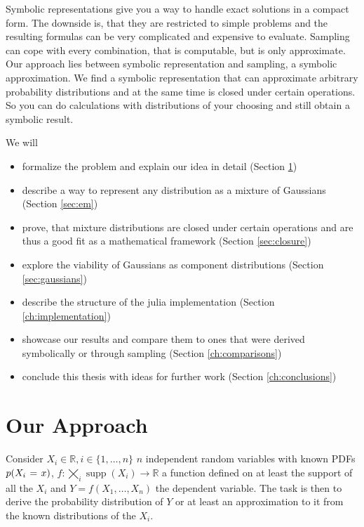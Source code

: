 \documentclass[11pt,a4paper]{book}
\DeclareMathOperator{\supp}{supp}
\begin{document}
Symbolic representations give you a way to handle exact solutions in a compact
form. The downside is, that they are restricted to simple problems and the
resulting formulas can be very complicated and expensive to evaluate. Sampling
can cope with every combination, that is computable, but is only
approximate. Our approach lies between symbolic representation and sampling, a
symbolic approximation. We find a symbolic representation that can approximate
arbitrary probability distributions and at the same time is closed under certain
operations. So you can do calculations with distributions of your choosing and
still obtain a symbolic result.

We will
\begin{itemize}
\item formalize the problem and explain our idea in detail (Section
  \ref{ch:idea})
\item describe a way to represent any distribution as a mixture of Gaussians
  (Section \ref{sec:em})
\item prove, that mixture distributions are closed under certain operations and
  are thus a good fit as a mathematical framework (Section \ref{sec:closure})
\item explore the viability of Gaussians as component distributions (Section
  \ref{sec:gaussians})
\item describe the structure of the julia implementation (Section
  \ref{ch:implementation})
\item showcase our results and compare them to ones that were derived
  symbolically or through sampling (Section \ref{ch:comparisons})
\item conclude this thesis with ideas for further work (Section
  \ref{ch:conclusions})
\end{itemize}

\chapter{Our Approach}
\label{ch:idea}

Consider $X_{i} \in \mathbb{R}, i \in \{ 1, \dots, n \}$ $n$ independent random
variables with known PDFs $p(X_{i}\hspace{0.1em}=\hspace{0.1em}x)$,
$f : \bigtimes_{i} \supp(X_{i}) \rightarrow \mathbb{R}$ a function defined on at
least the support of all the $X_{i}$ and $Y = f(X_{1}, \dots, X_{n})$ the
dependent variable. The task is then to derive the probability distribution of
$Y$ or at least an approximation to it from the known distributions of the
$X_{i}$.
\end{document}
